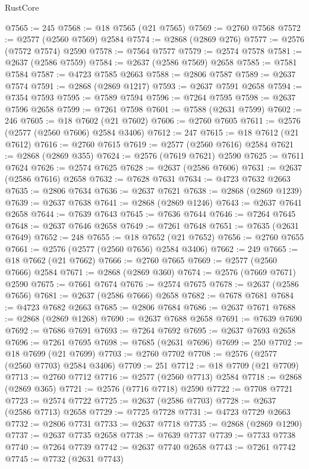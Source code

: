 \begin{lexlean}{RustCore}
\begin{coremodule}
@7565 := 245
@7568 := @18 @7565 (@21 @7565)
@7569 := @2760 @7568
@7572 := @2577 (@2560 @7569) @2584
@7574 := @2868 (@2869 @276)
@7577 := @2576 (@7572 @7574) @2590
@7578 := @7564 @7577
@7579 := @2574 @7578
@7581 := @2637 (@2586 @7559)
@7584 := @2637 (@2586 @7569) @2658
@7585 := @7581 @7584
@7587 := @4723 @7585 @2663
@7588 := @2806 @7587
@7589 := @2637 @7574
@7591 := @2868 (@2869 @1217)
@7593 := @2637 @7591 @2658
@7594 := @7354 @7593
@7595 := @7589 @7594
@7596 := @7264 @7595
@7598 := @2637 @7596 @2658
@7599 := @7261 @7598
@7601 := @7588 (@2631 @7599)
@7602 := 246
@7605 := @18 @7602 (@21 @7602)
@7606 := @2760 @7605
@7611 := @2576 (@2577 (@2560 @7606) @2584 @3406)
@7612 := 247
@7615 := @18 @7612 (@21 @7612)
@7616 := @2760 @7615
@7619 := @2577 (@2560 @7616) @2584
@7621 := @2868 (@2869 @355)
@7624 := @2576 (@7619 @7621) @2590
@7625 := @7611 @7624
@7626 := @2574 @7625
@7628 := @2637 (@2586 @7606)
@7631 := @2637 (@2586 @7616) @2658
@7632 := @7628 @7631
@7634 := @4723 @7632 @2663
@7635 := @2806 @7634
@7636 := @2637 @7621
@7638 := @2868 (@2869 @1239)
@7639 := @2637 @7638
@7641 := @2868 (@2869 @1246)
@7643 := @2637 @7641 @2658
@7644 := @7639 @7643
@7645 := @7636 @7644
@7646 := @7264 @7645
@7648 := @2637 @7646 @2658
@7649 := @7261 @7648
@7651 := @7635 (@2631 @7649)
@7652 := 248
@7655 := @18 @7652 (@21 @7652)
@7656 := @2760 @7655
@7661 := @2576 (@2577 (@2560 @7656) @2584 @3406)
@7662 := 249
@7665 := @18 @7662 (@21 @7662)
@7666 := @2760 @7665
@7669 := @2577 (@2560 @7666) @2584
@7671 := @2868 (@2869 @360)
@7674 := @2576 (@7669 @7671) @2590
@7675 := @7661 @7674
@7676 := @2574 @7675
@7678 := @2637 (@2586 @7656)
@7681 := @2637 (@2586 @7666) @2658
@7682 := @7678 @7681
@7684 := @4723 @7682 @2663
@7685 := @2806 @7684
@7686 := @2637 @7671
@7688 := @2868 (@2869 @1268)
@7690 := @2637 @7688 @2658
@7691 := @7639 @7690
@7692 := @7686 @7691
@7693 := @7264 @7692
@7695 := @2637 @7693 @2658
@7696 := @7261 @7695
@7698 := @7685 (@2631 @7696)
@7699 := 250
@7702 := @18 @7699 (@21 @7699)
@7703 := @2760 @7702
@7708 := @2576 (@2577 (@2560 @7703) @2584 @3406)
@7709 := 251
@7712 := @18 @7709 (@21 @7709)
@7713 := @2760 @7712
@7716 := @2577 (@2560 @7713) @2584
@7718 := @2868 (@2869 @365)
@7721 := @2576 (@7716 @7718) @2590
@7722 := @7708 @7721
@7723 := @2574 @7722
@7725 := @2637 (@2586 @7703)
@7728 := @2637 (@2586 @7713) @2658
@7729 := @7725 @7728
@7731 := @4723 @7729 @2663
@7732 := @2806 @7731
@7733 := @2637 @7718
@7735 := @2868 (@2869 @1290)
@7737 := @2637 @7735 @2658
@7738 := @7639 @7737
@7739 := @7733 @7738
@7740 := @7264 @7739
@7742 := @2637 @7740 @2658
@7743 := @7261 @7742
@7745 := @7732 (@2631 @7743)

\end{coremodule}
\end{lexlean}
